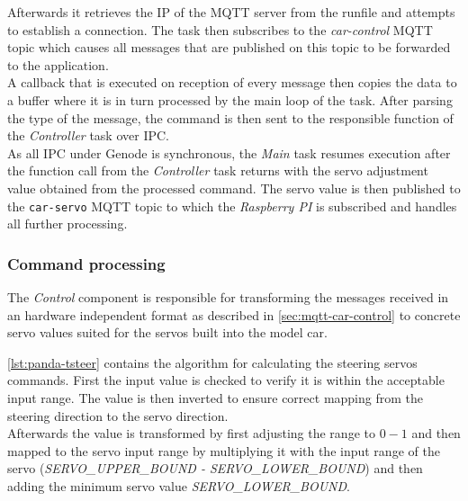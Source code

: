 Afterwards it retrieves the IP of the MQTT server from the runfile and attempts to establish a connection.
The task then subscribes to the \textit{car-control} MQTT topic which causes all messages that are published on this topic to be forwarded to the application. \\

A callback that is executed on reception of every message then copies the data to a buffer where it is in turn processed by the main loop of the task.
After parsing the type of the message, the command is then sent to the responsible function of the \textit{Controller} task over IPC. \\

As all IPC under Genode is synchronous, the \textit{Main} task resumes execution after the function call from the \textit{Controller} task returns with the servo adjustment value obtained from the processed command.
The servo value is then published to the \texttt{car-servo} MQTT topic to which the \textit{Raspberry PI} is subscribed and handles all further processing.


\subsubsection{Command processing}
\label{sec:panda-convert}
The \textit{Control} component is responsible for transforming the messages received in an hardware independent format as described in \autoref{sec:mqtt-car-control} to concrete servo values suited for the servos built into the model car.

\autoref{lst:panda-tsteer} contains the algorithm for calculating the steering servos commands.
First the input value is checked to verify it is within the acceptable input range.
The value is then inverted to ensure correct mapping from the steering direction to the servo direction. \\

Afterwards the value is transformed by first adjusting the range to $0-1$ and then mapped to the servo input range by multiplying it with the input range of the servo (\textit{SERVO\_UPPER\_BOUND - SERVO\_LOWER\_BOUND}) and then adding the minimum servo value \textit{SERVO\_LOWER\_BOUND}. \\


